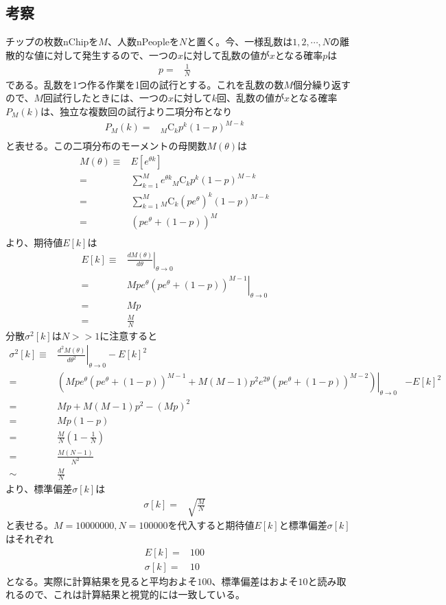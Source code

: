 \documentclass[ %
  platex,%
  papersize,%
  twocolumn,
  landscape
]{jsarticle}
\begin{document}
\subsection{考察}
チップの枚数nChipを$M$、人数nPeopleを$N$と置く。今、一様乱数は$1,2,\cdots,N$の離散的な値に対して発生するので、一つの$x$に対して乱数の値が$x$となる確率$p$は
\begin{align}
  p=&\frac{1}{N}&
\end{align}
である。乱数を1つ作る作業を1回の試行とする。これを乱数の数$M$個分繰り返すので、$M$回試行したときには、一つの$x$に対して$k$回、乱数の値が$x$となる確率$P_M(k)$は、独立な複数回の試行より二項分布となり
\begin{align}
  P_M(k)=&{}_M \mathrm{C}_k p^k (1-p)^{M-k}&\\
\end{align}
と表せる。この二項分布のモーメントの母関数$M(\theta)$は
\begin{align}
  M(\theta)\equiv&E[e^{\theta k}]&\\
  =&\sum_{k=1}^{M}e^{\theta k}{}_M \mathrm{C}_k p^k (1-p)^{M-k}&\\
  =&\sum_{k=1}^{M}{}_M \mathrm{C}_k \left(pe^{\theta}\right)^k (1-p)^{M-k}&\\
  =&\left(pe^{\theta}+(1-p)\right)^M&\\
\end{align}
より、期待値$E[k]$は
\begin{align}
  E[k]\equiv&\left.\frac{dM(\theta)}{d\theta}\right|_{\theta\rightarrow0}&\\
  =&\left.Mpe^{\theta}\left(pe^{\theta}+(1-p)\right)^{M-1}\right|_{\theta\rightarrow0}&\\
  =&Mp&\\
  =&\frac{M}{N}&
\end{align}
分散$\sigma^{2}[k]$は$N>>1$に注意すると
\begin{align}
  \sigma^{2}[k]\equiv&\left.\frac{d^{2}M(\theta)}{d\theta^2}\right|_{\theta\rightarrow0}-E[k]^2&\\
  =&\left.\left(Mpe^{\theta}\left(pe^{\theta}+(1-p)\right)^{M-1}+M(M-1)p^{2}e^{2\theta}\left(pe^{\theta}+(1-p)\right)^{M-2}\right)\right|_{\theta\rightarrow0}&-E[k]^2\\
  =&Mp+M(M-1)p^{2}-(Mp)^2&\\
  =&Mp(1-p)&\\
  =&\frac{M}{N}\left(1-\frac{1}{N}\right)&\\
  =&\frac{M(N-1)}{N^2}&\\
  \sim&\frac{M}{N}&
\end{align}
より、標準偏差$\sigma[k]$は
\begin{align}
  \sigma[k]=&\sqrt{\frac{M}{N}}&
\end{align}
と表せる。$M=10000000, N=100000$を代入すると期待値$E[k]$と標準偏差$\sigma[k]$はそれぞれ
\begin{align}
  E[k]=&100&\\
  \sigma[k]=&10&
\end{align}
となる。実際に計算結果を見ると平均およそ$100$、標準偏差はおよそ$10$と読み取れるので、これは計算結果と視覚的には一致している。
\end{document}
